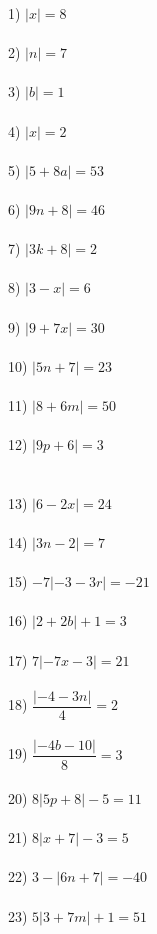 \documentclass[12pt]{article}
\theoremstyle{definition}
\begin{document}
\begin{multicols}{3}
  1) $| x| = 8$\\ \ \\
  2) $| n | = 7$\\ \ \\
  3) $| b| = 1$\\ \ \\
  4) $| x | = 2$\\ \ \\
  5) $| 5 + 8 a| = 53$\\ \ \\
  6) $|9n + 8| = 46$\\ \ \\
  7) $|3k + 8| = 2$\\ \ \\
  8) $|3 - x| = 6$\\ \ \\
  9) $|9 + 7 x| = 30$\\ \ \\
  10) $|5n + 7| = 23$\\ \ \\
  11) $|8 + 6 m| = 50$\\ \ \\
  12) $|9p + 6| = 3$\\ \ \\ \ \\
  13) $|6 - 2 x| = 24$\\ \ \\
  14) $|3n - 2| = 7$\\ \ \\
  15) $- 7| - 3 - 3 r| = - 21$\\ \ \\
  16) $| 2 + 2 b| + 1 = 3$\\ \ \\
  17) $7 | - 7 x - 3| = 21$\\ \ \\
  18) $\dfrac{| - 4 - 3 n|}{4} = 2$\\ \ \\
  19) $\dfrac{| - 4 b - 10|}{8} = 3$\\ \ \\
  20) $8 |5p + 8| - 5 = 11$\\ \ \\
  21) $8 | x + 7 | - 3 = 5$\\ \ \\
  22) $3 - |6n + 7| = - 40$\\ \ \\
  23) $5 |3 + 7 m| + 1 = 51$\\ \ \\

\end{multicols}
\end{document}
